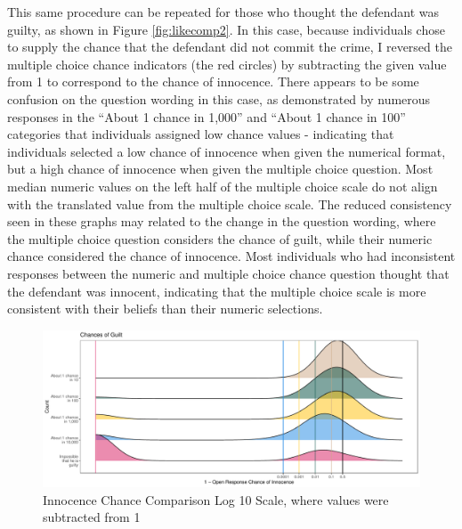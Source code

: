\documentclass[print]{nuthesis}
\begin{document}
This same procedure can be repeated for those who thought the defendant was guilty, as shown in Figure \ref{fig:likecomp2}.
In this case, because individuals chose to supply the chance that the defendant did not commit the crime, I reversed the multiple choice chance indicators (the red circles) by subtracting the given value from 1 to correspond to the chance of innocence.
There appears to be some confusion on the question wording in this case, as demonstrated by numerous responses in the ``About 1 chance in 1,000'' and ``About 1 chance in 100'' categories that individuals assigned low chance values - indicating that individuals selected a low chance of innocence when given the numerical format, but a high chance of innocence when given the multiple choice question.
Most median numeric values on the left half of the multiple choice scale do not align with the translated value from the multiple choice scale.
The reduced consistency seen in these graphs may related to the change in the question wording, where the multiple choice question considers the chance of guilt, while their numeric chance considered the chance of innocence.
Most individuals who had inconsistent responses between the numeric and multiple choice chance question thought that the defendant was innocent, indicating that the multiple choice scale is more consistent with their beliefs than their numeric selections.

\begin{figure}

{\centering \includegraphics[width=\linewidth]{thesis_files/figure-latex/likecomp2scale-1} 

}

\caption{Innocence Chance Comparison Log 10 Scale, where values were subtracted from 1}\label{fig:likecomp2scale}
\end{figure}
\end{document}
